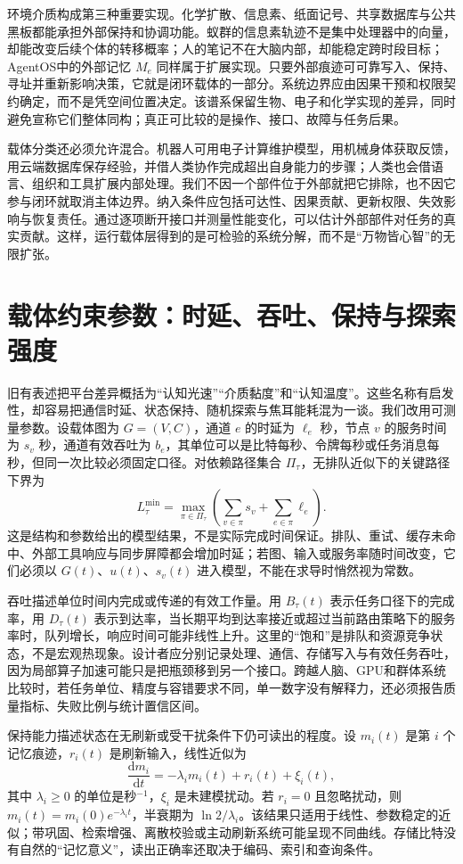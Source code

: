 环境介质构成第三种重要实现。化学扩散、信息素、纸面记号、共享数据库与公共黑板都能承担外部保持和协调功能。蚁群的信息素轨迹不是集中处理器中的向量，却能改变后续个体的转移概率；人的笔记不在大脑内部，却能稳定跨时段目标；AgentOS中的外部记忆 $M_e$ 同样属于扩展实现。只要外部痕迹可可靠写入、保持、寻址并重新影响决策，它就是闭环载体的一部分。系统边界应由因果干预和权限契约确定，而不是凭空间位置决定。该谱系保留生物、电子和化学实现的差异，同时避免宣称它们整体同构；真正可比较的是操作、接口、故障与任务后果。

载体分类还必须允许混合。机器人可用电子计算维护模型，用机械身体获取反馈，用云端数据库保存经验，并借人类协作完成超出自身能力的步骤；人类也会借语言、组织和工具扩展内部处理。我们不因一个部件位于外部就把它排除，也不因它参与闭环就取消主体边界。纳入条件应包括可达性、因果贡献、更新权限、失效影响与恢复责任。通过逐项断开接口并测量性能变化，可以估计外部部件对任务的真实贡献。这样，运行载体层得到的是可检验的系统分解，而不是“万物皆心智”的无限扩张。

\section{载体约束参数：时延、吞吐、保持与探索强度}
\label{sec:physical_constants}

旧有表述把平台差异概括为“认知光速”“介质黏度”和“认知温度”。这些名称有启发性，却容易把通信时延、状态保持、随机探索与焦耳能耗混为一谈。我们改用可测量参数。设载体图为 $G=(V,C)$，通道 $e$ 的时延为 $\ell_e$ 秒，节点 $v$ 的服务时间为 $s_v$ 秒，通道有效吞吐为 $b_e$，其单位可以是比特每秒、令牌每秒或任务消息每秒，但同一次比较必须固定口径。对依赖路径集合 $\Pi_\tau$，无排队近似下的关键路径下界为
\[
L_\tau^{\min}=\max_{\pi\in\Pi_\tau}\left(\sum_{v\in\pi}s_v+\sum_{e\in\pi}\ell_e\right).
\]
这是结构和参数给出的模型结果，不是实际完成时间保证。排队、重试、缓存未命中、外部工具响应与同步屏障都会增加时延；若图、输入或服务率随时间改变，它们必须以 $G(t)$、$u(t)$、$s_v(t)$ 进入模型，不能在求导时悄然视为常数。

吞吐描述单位时间内完成或传递的有效工作量。用 $B_\tau(t)$ 表示任务口径下的完成率，用 $D_\tau(t)$ 表示到达率，当长期平均到达率接近或超过当前路由策略下的服务率时，队列增长，响应时间可能非线性上升。这里的“饱和”是排队和资源竞争状态，不是宏观热现象。设计者应分别记录处理、通信、存储写入与有效任务吞吐，因为局部算子加速可能只是把瓶颈移到另一个接口。跨越人脑、GPU和群体系统比较时，若任务单位、精度与容错要求不同，单一数字没有解释力，还必须报告质量指标、失败比例与统计置信区间。

保持能力描述状态在无刷新或受干扰条件下仍可读出的程度。设 $m_i(t)$ 是第 $i$ 个记忆痕迹，$r_i(t)$ 是刷新输入，线性近似为
\[
\frac{\mathrm d m_i}{\mathrm dt}=-\lambda_i m_i(t)+r_i(t)+\xi_i(t),
\]
其中 $\lambda_i\ge0$ 的单位是秒$^{-1}$，$\xi_i$ 是未建模扰动。若 $r_i=0$ 且忽略扰动，则 $m_i(t)=m_i(0)e^{-\lambda_i t}$，半衰期为 $\ln2/\lambda_i$。该结果只适用于线性、参数稳定的近似；带巩固、检索增强、离散校验或主动刷新系统可能呈现不同曲线。存储比特没有自然的“记忆意义”，读出正确率还取决于编码、索引和查询条件。

